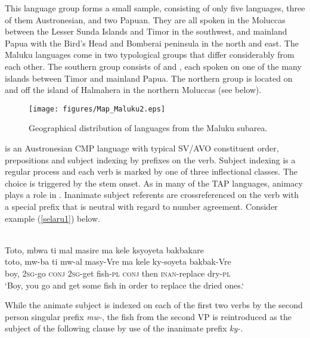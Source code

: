 This language group forms a small sample, consisting of only five languages, three of them Austronesian, and two Papuan. They are all spoken in the Moluccas between the Lesser Sunda Islands and Timor in the southwest, and mainland Papua with the Bird's Head and Bomberai peninsula in the north and east. The Maluku languages come in two typological groups that differ considerably from each other. The southern group consists of  and , each spoken on one of the many islands between Timor and mainland Papua. The northern group is located on and off the island of Halmahera in the northern Moluccas (see  below).

\begin{figure}
\texttt{[image: figures/Map\_Maluku2.eps]}
\caption{Geographical distribution of languages from the Maluku subarea.}\label{map:Mal}

\end{figure}

 is an Austronesian CMP language with typical SV/AVO constituent order, prepositions and subject indexing by prefixes on the verb. Subject indexing is a regular process and each verb is marked by one of three inflectional classes. The choice is triggered by the stem onset. As in many of the TAP languages, animacy plays a role in . Inanimate subject referents are crossreferenced on the verb with a special prefix that is neutral with regard to number agreement. Consider example (\ref{selaru1}) below.

\ea \label{selaru1}
\\
\glll Toto, mbwa ti mal masire ma kele ksyoyeta bakbakare\\
toto, mw-ba ti mw-al masy-Vre ma kele ky-soyeta bakbak-Vre\\
boy, \textsc{2}\textsc{sg}-go \textsc{conj} \textsc{2}\textsc{sg}-get fish-\textsc{pl} \textsc{conj} then \textsc{inan}-replace dry-\textsc{pl} \\
\glft `Boy, you go and get some fish in order to replace the dried ones.‘
\z

\largerpage[1]
While the animate subject is indexed on each of the first two verbs by the second person singular prefix \textit{mw-}, the fish from the second VP is reintroduced as the subject of the following clause by use of the inanimate prefix \textit{ky-}. 

